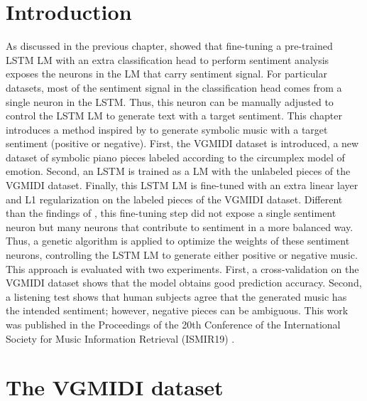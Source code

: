 \section{Introduction}

As discussed in the previous chapter, \citet{radford_2017} showed that fine-tuning a pre-trained  LSTM LM with an extra classification head to perform sentiment analysis exposes the neurons in the LM that carry sentiment signal. For particular datasets, most of the sentiment signal in the classification head comes from a single neuron in the LSTM. Thus, this neuron can be manually adjusted to control the LSTM LM to generate text with a target sentiment. This chapter introduces a method inspired by \citet{radford_2017} to generate symbolic music with a target sentiment (positive or negative). First, the VGMIDI dataset is introduced, a new dataset of symbolic piano pieces labeled according to the circumplex model of emotion. Second, an LSTM is trained as a LM with the unlabeled pieces of the VGMIDI dataset. Finally, this LSTM LM is fine-tuned with an extra linear layer and L1 regularization on the labeled pieces of the VGMIDI dataset. Different than the findings of \citet{radford_2017}, this fine-tuning step did not expose a single sentiment neuron but many neurons that contribute to sentiment in a more balanced way. Thus, a genetic algorithm is applied to optimize the weights of these sentiment neurons, controlling the LSTM LM to generate either positive or negative music. This approach is evaluated with two experiments. First, a cross-validation on the VGMIDI dataset shows that the model obtains good prediction accuracy. Second, a listening test shows that human subjects agree that the generated music has the intended sentiment; however, negative pieces can be ambiguous. This work was published in the Proceedings of the 20th Conference of the International Society for Music Information Retrieval (ISMIR19) \cite{ferreira_2019}.

\section{The VGMIDI dataset}

